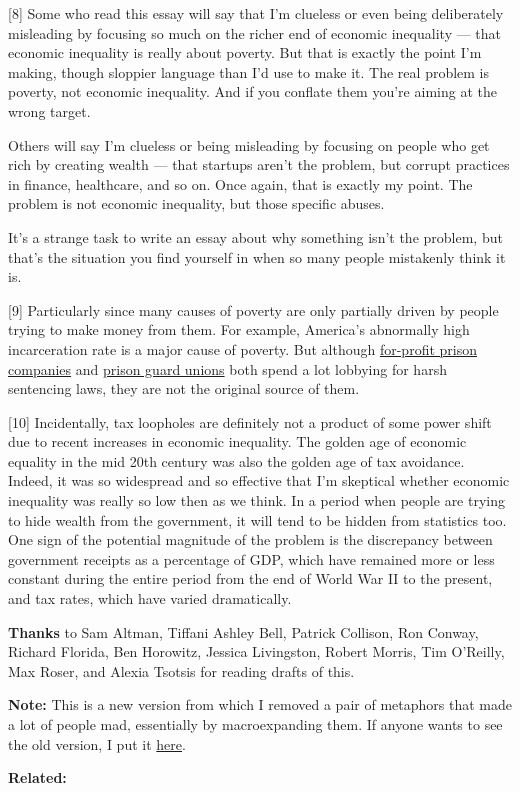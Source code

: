 {[}8{]} Some who read this essay will say that I'm clueless or even
being deliberately misleading by focusing so much on the richer end of
economic inequality --- that economic inequality is really about
poverty. But that is exactly the point I'm making, though sloppier
language than I'd use to make it. The real problem is poverty, not
economic inequality. And if you conflate them you're aiming at the wrong
target.

Others will say I'm clueless or being misleading by focusing on people
who get rich by creating wealth --- that startups aren't the problem,
but corrupt practices in finance, healthcare, and so on. Once again,
that is exactly my point. The problem is not economic inequality, but
those specific abuses.

It's a strange task to write an essay about why something isn't the
problem, but that's the situation you find yourself in when so many
people mistakenly think it is.

{[}9{]} Particularly since many causes of poverty are only partially
driven by people trying to make money from them. For example, America's
abnormally high incarceration rate is a major cause of poverty. But
although
\href{https://www.washingtonpost.com/posteverything/wp/2015/04/28/how-for-profit-prisons-have-become-the-biggest-lobby-no-one-is-talking-about/}{for-profit
prison companies} and
\href{http://mic.com/articles/41531/union-of-the-snake-how-california-s-prison-guards-subvert-democracy}{prison
guard unions} both spend a lot lobbying for harsh sentencing laws, they
are not the original source of them.

{[}10{]} Incidentally, tax loopholes are definitely not a product of
some power shift due to recent increases in economic inequality. The
golden age of economic equality in the mid 20th century was also the
golden age of tax avoidance. Indeed, it was so widespread and so
effective that I'm skeptical whether economic inequality was really so
low then as we think. In a period when people are trying to hide wealth
from the government, it will tend to be hidden from statistics too. One
sign of the potential magnitude of the problem is the discrepancy
between government receipts as a percentage of GDP, which have remained
more or less constant during the entire period from the end of World War
II to the present, and tax rates, which have varied dramatically.

\textbf{Thanks} to Sam Altman, Tiffani Ashley Bell, Patrick Collison,
Ron Conway, Richard Florida, Ben Horowitz, Jessica Livingston, Robert
Morris, Tim O'Reilly, Max Roser, and Alexia Tsotsis for reading drafts
of this.

\textbf{Note:} This is a new version from which I removed a pair of
metaphors that made a lot of people mad, essentially by macroexpanding
them. If anyone wants to see the old version, I put it
\href{ineqold.html}{here}.

\textbf{Related:}
